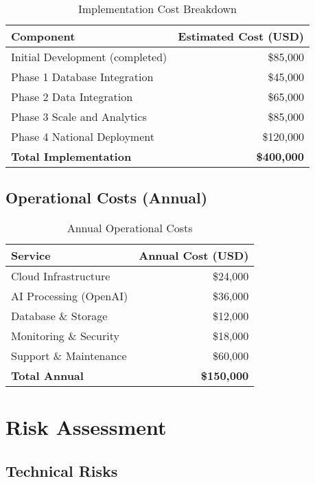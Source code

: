 \documentclass[11pt,a4paper]{article}
\begin{document}
\begin{table}[H]
\centering
\begin{tabular}{lr}
\toprule
\textbf{Component} & \textbf{Estimated Cost (USD)} \\
\midrule
Initial Development (completed) & \$85,000 \\
Phase 1 Database Integration & \$45,000 \\
Phase 2 Data Integration & \$65,000 \\
Phase 3 Scale and Analytics & \$85,000 \\
Phase 4 National Deployment & \$120,000 \\
\midrule
\textbf{Total Implementation} & \textbf{\$400,000} \\
\bottomrule
\end{tabular}
\caption{Implementation Cost Breakdown}
\end{table}

\subsection{Operational Costs (Annual)}

\begin{table}[H]
\centering
\begin{tabular}{lr}
\toprule
\textbf{Service} & \textbf{Annual Cost (USD)} \\
\midrule
Cloud Infrastructure & \$24,000 \\
AI Processing (OpenAI) & \$36,000 \\
Database \& Storage & \$12,000 \\
Monitoring \& Security & \$18,000 \\
Support \& Maintenance & \$60,000 \\
\midrule
\textbf{Total Annual} & \textbf{\$150,000} \\
\bottomrule
\end{tabular}
\caption{Annual Operational Costs}
\end{table}

\section{Risk Assessment}

\subsection{Technical Risks}
\end{document}
